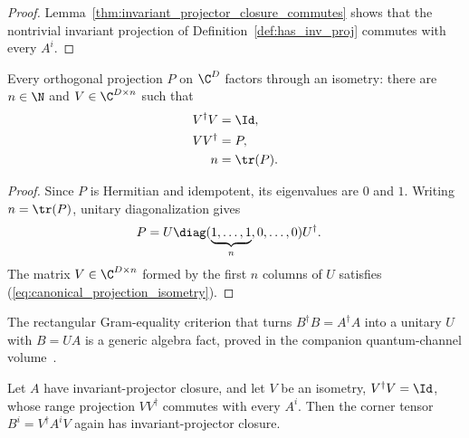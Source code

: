\begin{proof}
    \leanok
    Lemma~\ref{thm:invariant_projector_closure_commutes} shows that the
    nontrivial invariant projection of Definition~\ref{def:has_inv_proj}
    commutes with every $A^i$.
\end{proof}

\begin{lemma}
    \label{lem:projection_support_isometry}
    \leanok

    Every orthogonal projection $P$ on $\C^D$ factors through an isometry:
    there are $n\in\N$ and $V\in\C^{D\times n}$ such that
    \begin{align}
        V^\dagger V
         & = \Id,
        \notag       \\
        VV^\dagger
         & = P,
        \notag       \\
        n
         & = \tr(P).
        \label{eq:canonical_projection_isometry}
    \end{align}
\end{lemma}

\begin{proof}
    \leanok
    Since $P$ is Hermitian and idempotent, its eigenvalues are $0$ and $1$.
    Writing $n=\tr(P)$, unitary diagonalization gives
    \begin{align}
        P
         & =
        U\diag(\underbrace{1,\ldots,1}_{n},0,\ldots,0)U^\dagger.
        \notag
    \end{align}
    The matrix $V\in\C^{D\times n}$ formed by the first $n$ columns of $U$
    satisfies (\ref{eq:canonical_projection_isometry}).
\end{proof}

The rectangular Gram-equality criterion that turns $B^\dagger B=A^\dagger A$
into a unitary $U$ with $B=UA$ is a generic algebra fact, proved in the
companion quantum-channel volume~\cite[``Rectangular Gram equality gives a unitary'']{QICLean2026Blueprint}.

\begin{lemma}
    \label{lem:projector_closure_corner}
    \leanok
    Let $A$ have invariant-projector closure, and let $V$ be an isometry,
    $V^\dagger V=\Id$, whose range projection $VV^\dagger$ commutes with every
    $A^i$. Then the corner tensor $B^i=V^\dagger A^iV$ again has
    invariant-projector closure.
\end{lemma}

